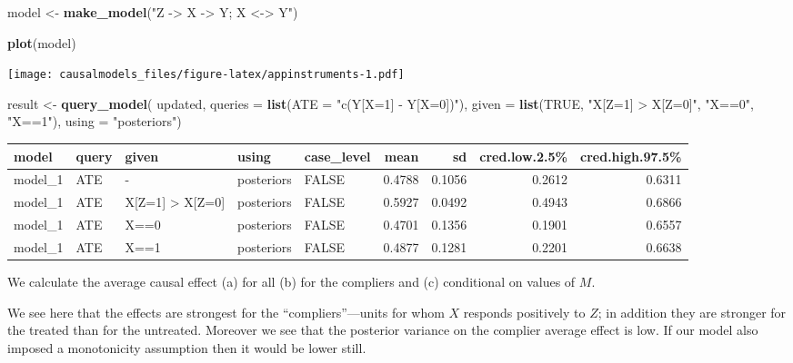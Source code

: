 \documentclass[
  12pt,
]{book}
\newenvironment{Shaded}{\begin{snugshade}}{\end{snugshade}}
\newcommand{\AttributeTok}[1]{\textcolor[rgb]{0.13,0.29,0.53}{#1}}
\newcommand{\ConstantTok}[1]{\textcolor[rgb]{0.56,0.35,0.01}{#1}}
\newcommand{\FunctionTok}[1]{\textcolor[rgb]{0.13,0.29,0.53}{\textbf{#1}}}
\newcommand{\NormalTok}[1]{#1}
\newcommand{\OtherTok}[1]{\textcolor[rgb]{0.56,0.35,0.01}{#1}}
\newcommand{\StringTok}[1]{\textcolor[rgb]{0.31,0.60,0.02}{#1}}
\begin{document}
\begin{Shaded}
\begin{Highlighting}[]
\NormalTok{model }\OtherTok{\textless{}{-}} \FunctionTok{make\_model}\NormalTok{(}\StringTok{"Z {-}\textgreater{} X {-}\textgreater{} Y; X \textless{}{-}\textgreater{} Y"}\NormalTok{)  }

\FunctionTok{plot}\NormalTok{(model)}
\end{Highlighting}
\end{Shaded}

\texttt{[image: causalmodels\_files/figure-latex/appinstruments-1.pdf]}

\begin{Shaded}
\begin{Highlighting}[]
\NormalTok{result }\OtherTok{\textless{}{-}} \FunctionTok{query\_model}\NormalTok{(}
\NormalTok{    updated, }
    \AttributeTok{queries =} \FunctionTok{list}\NormalTok{(}\AttributeTok{ATE =} \StringTok{"c(Y[X=1] {-} Y[X=0])"}\NormalTok{), }
    \AttributeTok{given =} \FunctionTok{list}\NormalTok{(}\ConstantTok{TRUE}\NormalTok{, }\StringTok{"X[Z=1] \textgreater{} X[Z=0]"}\NormalTok{,  }\StringTok{"X==0"}\NormalTok{,  }\StringTok{"X==1"}\NormalTok{),}
    \AttributeTok{using =} \StringTok{"posteriors"}\NormalTok{)}
\end{Highlighting}
\end{Shaded}

\begin{tabular}{l|l|l|l|l|r|r|r|r}
\hline
model & query & given & using & case\_level & mean & sd & cred.low.2.5\% & cred.high.97.5\%\\
\hline
model\_1 & ATE & - & posteriors & FALSE & 0.4788 & 0.1056 & 0.2612 & 0.6311\\
\hline
model\_1 & ATE & X[Z=1] > X[Z=0] & posteriors & FALSE & 0.5927 & 0.0492 & 0.4943 & 0.6866\\
\hline
model\_1 & ATE & X==0 & posteriors & FALSE & 0.4701 & 0.1356 & 0.1901 & 0.6557\\
\hline
model\_1 & ATE & X==1 & posteriors & FALSE & 0.4877 & 0.1281 & 0.2201 & 0.6638\\
\hline
\end{tabular}

We calculate the average causal effect (a) for all (b) for the compliers and (c) conditional on values of \(M\).

We see here that the effects are strongest for the ``compliers''---units for whom \(X\) responds positively to \(Z\); in addition they are stronger for the treated than for the untreated. Moreover we see that the posterior variance on the complier average effect is low. If our model also imposed a monotonicity assumption then it would be lower still.
\end{document}
